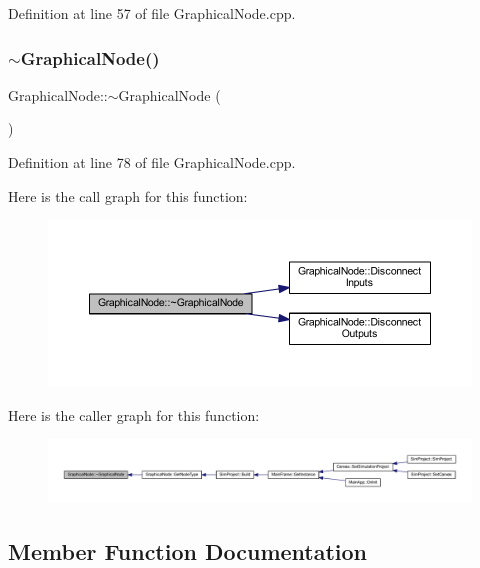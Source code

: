 Definition at line 57 of file Graphical\+Node.\+cpp.

\mbox{\label{class_graphical_node_a044a09111bb337580f2a40fcff42ef6f}} 
\subsubsection{\texorpdfstring{$\sim$\+Graphical\+Node()}{~GraphicalNode()}}
{\footnotesize\ttfamily Graphical\+Node\+::$\sim$\+Graphical\+Node (\begin{DoxyParamCaption}{ }\end{DoxyParamCaption})}



Definition at line 78 of file Graphical\+Node.\+cpp.

Here is the call graph for this function\+:
\nopagebreak
\begin{figure}[H]
\begin{center}
\leavevmode
\includegraphics[width=350pt]{class_graphical_node_a044a09111bb337580f2a40fcff42ef6f_cgraph}
\end{center}
\end{figure}
Here is the caller graph for this function\+:
\nopagebreak
\begin{figure}[H]
\begin{center}
\leavevmode
\includegraphics[width=350pt]{class_graphical_node_a044a09111bb337580f2a40fcff42ef6f_icgraph}
\end{center}
\end{figure}


\subsection{Member Function Documentation}
\mbox{\label{class_graphical_node_adf7b68c28c70426681cef018d34f8988}} 

